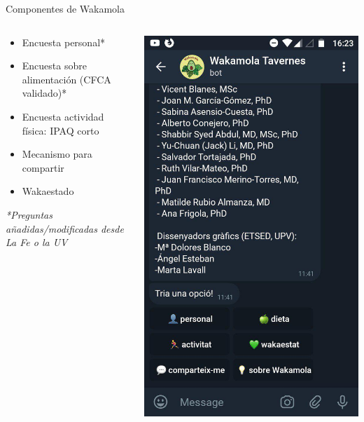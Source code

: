 \documentclass[bigger]{beamer}
\begin{document}
\begin{frame}{Componentes de Wakamola}
	\begin{columns}[T]
		\begin{column}[T]{6cm}
			\centering
			\vspace{0.1cm}
			\begin{itemize}
				\item Encuesta personal*
				\item Encuesta sobre alimentación (CFCA validado)*
				\item Encuesta actividad física: IPAQ corto
				\item Mecanismo para compartir
				\item Wakaestado
			\end{itemize}
		\tiny
		\textit{*Preguntas añadidas/modificadas desde La Fe o la UV}
		\end{column}
		\begin{column}[T]{6cm}
			\centering
			\includegraphics[scale=0.15]{img/teclado}

\end{column}
\end{columns}
\end{frame}
\end{document}
